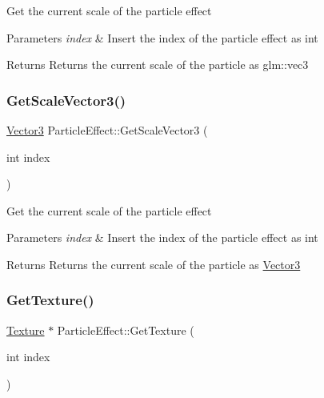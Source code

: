Get the current scale of the particle effect 
\begin{DoxyParams}{Parameters}
{\em index} & Insert the index of the particle effect as int \\
\hline
\end{DoxyParams}
\begin{DoxyReturn}{Returns}
Returns the current scale of the particle as glm\+::vec3 
\end{DoxyReturn}
\mbox{\label{class_particle_effect_acbcc803070f0aa89ddbba4989c1c7e9d}} 
\subsubsection{\texorpdfstring{GetScaleVector3()}{GetScaleVector3()}}
{\footnotesize\ttfamily \mbox{\hyperlink{struct_vector3}{Vector3}} Particle\+Effect\+::\+Get\+Scale\+Vector3 (\begin{DoxyParamCaption}\item[{int}]{index }\end{DoxyParamCaption})}

Get the current scale of the particle effect 
\begin{DoxyParams}{Parameters}
{\em index} & Insert the index of the particle effect as int \\
\hline
\end{DoxyParams}
\begin{DoxyReturn}{Returns}
Returns the current scale of the particle as \mbox{\hyperlink{struct_vector3}{Vector3}} 
\end{DoxyReturn}
\mbox{\label{class_particle_effect_a4479666080a2a5d8b92b0ea74d401895}} 
\subsubsection{\texorpdfstring{GetTexture()}{GetTexture()}}
{\footnotesize\ttfamily \mbox{\hyperlink{class_texture}{Texture}} $\ast$ Particle\+Effect\+::\+Get\+Texture (\begin{DoxyParamCaption}\item[{int}]{index }\end{DoxyParamCaption})}

